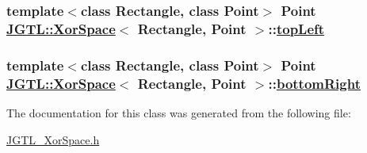 \hypertarget{class_j_g_t_l_1_1_xor_space_9220f06140cf547c2521372da2d97f80}{
\subsubsection[topLeft]{\setlength{\rightskip}{0pt plus 5cm}template$<$class Rectangle, class Point$>$ Point \hyperlink{class_j_g_t_l_1_1_xor_space}{JGTL::Xor\-Space}$<$ Rectangle, Point $>$::\hyperlink{class_j_g_t_l_1_1_xor_space_9220f06140cf547c2521372da2d97f80}{top\-Left}}}
\label{class_j_g_t_l_1_1_xor_space_9220f06140cf547c2521372da2d97f80}


\hypertarget{class_j_g_t_l_1_1_xor_space_e76eebb329d0056211ff1c0caee42364}{
\subsubsection[bottomRight]{\setlength{\rightskip}{0pt plus 5cm}template$<$class Rectangle, class Point$>$ Point \hyperlink{class_j_g_t_l_1_1_xor_space}{JGTL::Xor\-Space}$<$ Rectangle, Point $>$::\hyperlink{class_j_g_t_l_1_1_xor_space_e76eebb329d0056211ff1c0caee42364}{bottom\-Right}}}
\label{class_j_g_t_l_1_1_xor_space_e76eebb329d0056211ff1c0caee42364}




The documentation for this class was generated from the following file:\begin{CompactItemize}
\item 
\hyperlink{_j_g_t_l___xor_space_8h}{JGTL\_\-Xor\-Space.h}\end{CompactItemize}
